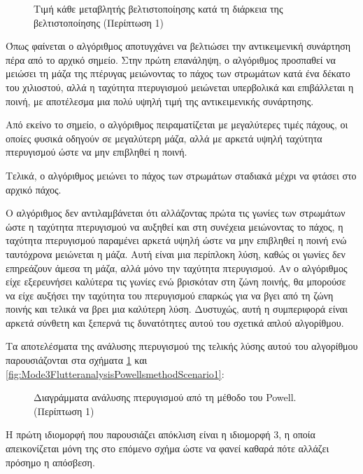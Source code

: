 \begin{figure}[H]
    \centering
    
    \caption{Τιμή κάθε μεταβλητής βελτιστοποίησης κατά τη διάρκεια της βελτιστοποίησης (Περίπτωση 1)
    }
\end{figure}

Όπως φαίνεται ο αλγόριθμος αποτυγχάνει να βελτιώσει την αντικειμενική συνάρτηση πέρα από το αρχικό σημείο. Στην πρώτη επανάληψη, ο αλγόριθμος προσπαθεί να μειώσει τη μάζα της πτέρυγας μειώνοντας το πάχος των στρωμάτων κατά ένα δέκατο του χιλιοστού, αλλά η ταχύτητα πτερυγισμού μειώνεται υπερβολικά και επιβάλλεται η ποινή, με αποτέλεσμα μια πολύ υψηλή τιμή της αντικειμενικής συνάρτησης.

Από εκείνο το σημείο, ο αλγόριθμος πειραματίζεται με μεγαλύτερες τιμές πάχους, οι οποίες φυσικά οδηγούν σε μεγαλύτερη μάζα, αλλά με αρκετά υψηλή ταχύτητα πτερυγισμού ώστε να μην επιβληθεί η ποινή.

Τελικά, ο αλγόριθμος μειώνει το πάχος των στρωμάτων σταδιακά μέχρι να φτάσει στο αρχικό πάχος.

Ο αλγόριθμος δεν αντιλαμβάνεται ότι αλλάζοντας πρώτα τις γωνίες των στρωμάτων ώστε η ταχύτητα πτερυγισμού να αυξηθεί και στη συνέχεια μειώνοντας το πάχος, η ταχύτητα πτερυγισμού παραμένει αρκετά υψηλή ώστε να μην επιβληθεί η ποινή ενώ ταυτόχρονα μειώνεται η μάζα. Αυτή είναι μια περίπλοκη λύση, καθώς οι γωνίες δεν επηρεάζουν άμεσα τη μάζα, αλλά μόνο την ταχύτητα πτερυγισμού. Αν ο αλγόριθμος είχε εξερευνήσει καλύτερα τις γωνίες ενώ βρισκόταν στη ζώνη ποινής, θα μπορούσε να είχε αυξήσει την ταχύτητα του πτερυγισμού επαρκώς για να βγει από τη ζώνη ποινής και τελικά να βρει μια καλύτερη λύση. Δυστυχώς, αυτή η συμπεριφορά είναι αρκετά σύνθετη και ξεπερνά τις δυνατότητες αυτού του σχετικά απλού αλγορίθμου.

Τα αποτελέσματα της ανάλυσης πτερυγισμού της τελικής λύσης αυτού του αλγορίθμου παρουσιάζονται στα σχήματα \ref{fig:FlutteranalysisplotsfromPowellsmethodScenario1} και \ref{fig:Mode3FlutteranalysisPowellsmethodScenario1}:


\begin{figure}[H]
    \centering
    
    \caption{Διαγράμματα ανάλυσης πτερυγισμού από τη μέθοδο του \textlatin{Powell}. (Περίπτωση 1)}
    \label{fig:FlutteranalysisplotsfromPowellsmethodScenario1}
\end{figure}

Η πρώτη ιδιομορφή που παρουσιάζει απόκλιση είναι η ιδιομορφή 3, η οποία απεικονίζεται μόνη της στο επόμενο σχήμα ώστε να φανεί καθαρά πότε αλλάζει πρόσημο η απόσβεση.


